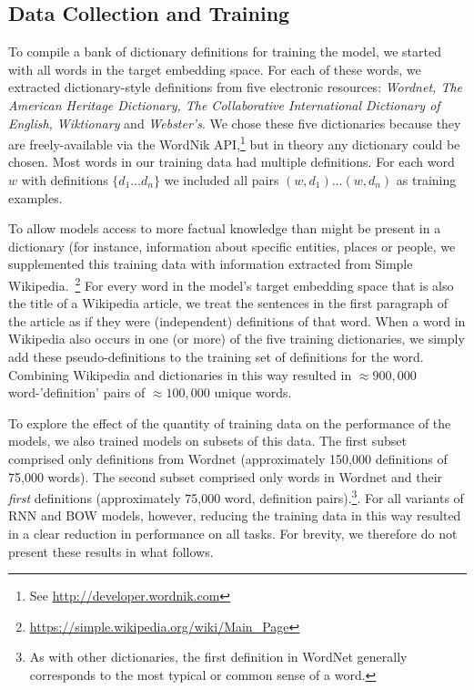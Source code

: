 \documentclass[11pt,letterpaper]{article}
\begin{document}
\subsection{Data Collection and Training}

To compile a bank of dictionary definitions for training the model, we started with all words in the target embedding space. For each of these words, we extracted dictionary-style definitions from five electronic resources: \emph{Wordnet, The American Heritage Dictionary, The Collaborative International Dictionary of English, Wiktionary} and \emph{Webster's}. We chose these five dictionaries because they are freely-available via the WordNik API,\footnote{See \url{http://developer.wordnik.com}} but in theory any dictionary could be chosen. Most words in our training data had multiple definitions. For each word \(w\) with definitions \( \{d_1 \dots d_n\} \) we included all pairs \((w, d_1) \dots (w,d_n) \) as training examples. 

To allow models access to more factual knowledge than might be present in a dictionary (for instance, information about specific entities, places or people, we supplemented this training data with information extracted from Simple Wikipedia.~\footnote{\url{https://simple.wikipedia.org/wiki/Main_Page}} For every word in the model's target embedding space that is also the title of a Wikipedia article, we treat the sentences in the first paragraph of the article as if they were (independent) definitions of that word. When a word in Wikipedia also occurs in one (or more) of the five training dictionaries, we simply add these pseudo-definitions to the training set of definitions for the word. Combining Wikipedia and dictionaries in this way resulted in \(\approx 900,000\) word-'definition' pairs of \(\approx 100,000\) unique words. 

To explore the effect of the quantity of training data on the performance of the models, we also trained models on subsets of this data. The first subset comprised only definitions from Wordnet (approximately 150,000 definitions of 75,000 words). The second subset comprised only words in Wordnet and their \emph{first} definitions (approximately 75,000 word, definition pairs).\footnote{As with other dictionaries, the first definition in WordNet generally corresponds to the most typical or common sense of a word.}. For all variants of RNN and BOW models, however, reducing the training data in this way resulted in a clear reduction in performance on all tasks. For brevity, we therefore do not present these results in what follows.  
\end{document}
